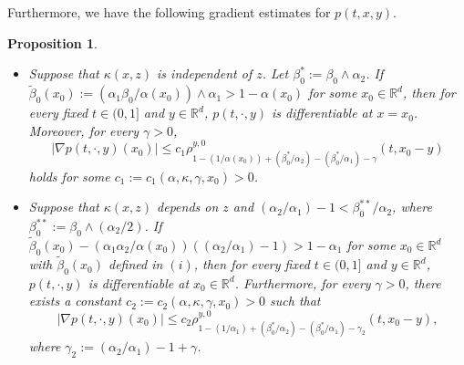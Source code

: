 \documentclass[a4paper,11pt]{amsart}
\renewcommand{\le}{\leqslant}
\newcommand{\R}{\mathds R}
\newcommand{\B}{\beta}
\newcommand{\K}{\kappa}
\newcommand{\A}{\alpha}
\newcommand{\G}{\gamma}
\newtheorem{proposition}[theorem]{Proposition}
\theoremstyle{definition}
\begin{document}
Furthermore, we have the following gradient estimates for $p(t,x,y)$.

\begin{proposition}\label{t5-1}
\begin{itemize}
\item[(1)]
Suppose that $\K(x,z)$ is independent of $z$. Let $\B_0^*:=\B_0\wedge\A_2$.
If $\tilde \B_0(x_0):=({\A_1\B_0}/{\A(x_0)})\wedge\A_1>1-\A(x_0)$ for some $x_0 \in \R^d$, then for every fixed $t \in (0,1]$ and $y \in \R^d$,
$p(t,\cdot,y)$ is differentiable at $x=x_0$. Moreover,
for every $\G>0$,
\begin{equation}\label{t5-1-1}
|\nabla p(t,\cdot,y)(x_0)|\le c_1\rho^{y,0}_{1-({1/\A(x_0)})+(\B_0^*/\A_2)-
(\B_0^*/\A_1)-\G}(t,x_0-y)
\end{equation}
holds for some $c_1:=c_1(\A,\K,\G,x_0)>0$.

\item[(2)]  Suppose that $\K(x,z)$ depends on $z$ and ${(\A_2/\A_1)}-1<\B_0^{**}/\A_2$, where $\B_0^{**}:=\B_0\wedge (\A_2/2)$.
If $\tilde \B_0(x_0)
-({\A_1\A_2}/{\A(x_0)})(({\A_2}/{\A_1})-1)>1-\A_1$ for some
$x_0\in \R^d$ with $\tilde \B_0(x_0)$ defined in $(i)$,
then for every fixed $t \in (0,1]$ and $y \in \R^d$, $p(t,\cdot,y)$ is differentiable at
$x_0\in \R^d$. Furthermore, for every $\G>0$, there exists a constant
$c_2:=c_2(\A,\K,\G,x_0)>0$ such that
\begin{equation}\label{t5-1-2}
|\nabla p(t,\cdot,y)(x_0)|\le c_2\rho^{y,0}_{1-({1}/{\A_1})+(\B_0^*/\A_2)-(\B_0^*/\A_1)-\G_2 }(t,x_0-y),
\end{equation}
where $\G_2 :={(\A_2/\A_1)}-1+\G$.
\end{itemize}
\end{proposition}
\end{document}
